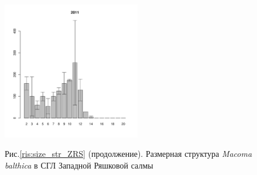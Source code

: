 \begin{figure}[hp]
\begin{minipage}[b]{.3\linewidth}
\begin{center}
	\end{center}
	\end{minipage}
	\hfill
	\begin{minipage}[b]{.3\linewidth}
	\begin{center}
	\includegraphics[width=60mm]{../White_Sea/Ryashkov_ZRS/zrs2_2011_.pdf}
	\end{center}
	\end{minipage}
	\hfill
	\begin{minipage}[b]{.3\linewidth}
	\begin{center}

	\end{center}
	\end{minipage}
\begin{center}
Рис.\ref{ris:size_str_ZRS} (продолжение). Размерная структура {\it Macoma balthica} в СГЛ Западной Ряшковой салмы
\end{center}
\end{figure}


